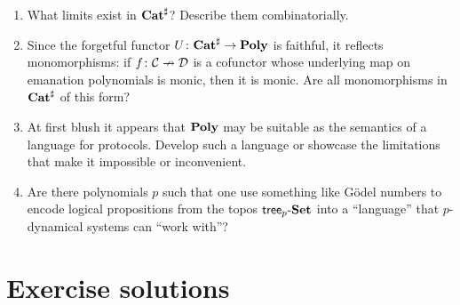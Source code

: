 \documentclass[Book-Poly]{subfiles}
\begin{document}
\begin{enumerate}
  \item What limits exist in $\mathbf{Cat}^\sharp$? Describe them combinatorially.
  \item Since the forgetful functor $U\colon\mathbf{Cat}^\sharp\to\mathbf{Poly}$ is faithful, it reflects monomorphisms: if $f\colon\mathcal{C}\nrightarrow\mathcal{D}$ is a cofunctor whose underlying map on emanation polynomials is monic, then it is monic. Are all monomorphisms in $\mathbf{Cat}^\sharp$ of this form?
  \item At first blush it appears that $\mathbf{Poly}$ may be suitable as the semantics of a language for protocols. Develop such a language or showcase the limitations that make it impossible or inconvenient.
  \item Are there polynomials $p$ such that one use something like G\"odel numbers to encode logical propositions from the topos $\mathsf{tree}_p\textnormal{-}\mathbf{Set}$ into a ``language'' that $p$-dynamical systems can ``work with''?
\end{enumerate}


\section{Exercise solutions}
{\footnotesize
}
\end{document}
